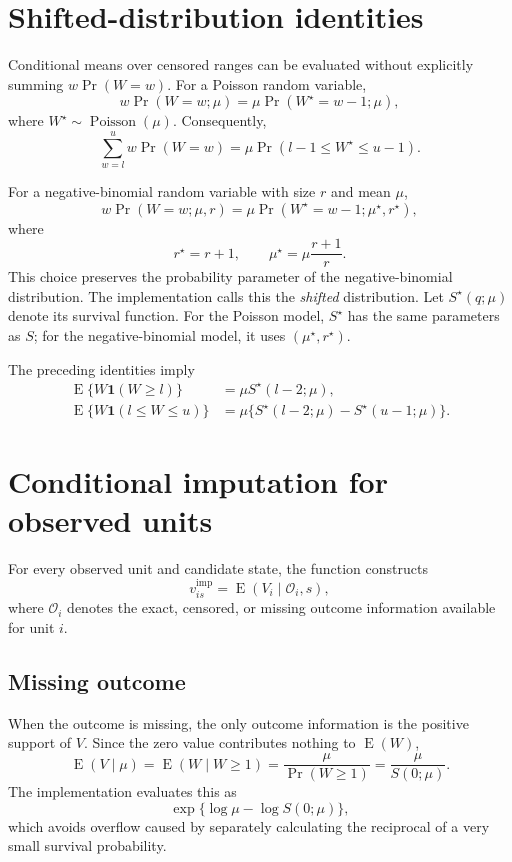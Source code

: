 \documentclass[11pt,a4paper]{article}
\begin{document}
\section{Shifted-distribution identities}

Conditional means over censored ranges can be evaluated without explicitly
summing $w\Pr(W=w)$. For a Poisson random variable,
\[
  w\Pr(W=w;\mu)
  =\mu\Pr(W^\star=w-1;\mu),
\]
where $W^\star\sim\operatorname{Poisson}(\mu)$. Consequently,
\[
  \sum_{w=l}^{u}w\Pr(W=w)
  =\mu\Pr(l-1\leq W^\star\leq u-1).
\]

For a negative-binomial random variable with size $r$ and mean $\mu$,
\[
  w\Pr(W=w;\mu,r)
  =\mu\Pr(W^\star=w-1;\mu^\star,r^\star),
\]
where
\[
  r^\star=r+1,
  \qquad
  \mu^\star=\mu\frac{r+1}{r}.
\]
This choice preserves the probability parameter of the negative-binomial
distribution. The implementation calls this the \emph{shifted} distribution.
Let $S^\star(q;\mu)$ denote its survival function. For the Poisson model,
$S^\star$ has the same parameters as $S$; for the negative-binomial model, it
uses $(\mu^\star,r^\star)$.

The preceding identities imply
\begin{align*}
  \operatorname{E}\{W\mathbf 1(W\geq l)\}
    &=\mu S^\star(l-2;\mu),\\
  \operatorname{E}\{W\mathbf 1(l\leq W\leq u)\}
    &=\mu\{S^\star(l-2;\mu)-S^\star(u-1;\mu)\}.
\end{align*}

\section{Conditional imputation for observed units}

For every observed unit and candidate state, the function constructs
\[
  v_{is}^{\mathrm{imp}}
  =\operatorname{E}(V_i\mid\mathcal O_i,s),
\]
where $\mathcal O_i$ denotes the exact, censored, or missing outcome
information available for unit $i$.

\subsection{Missing outcome}

When the outcome is missing, the only outcome information is the positive
support of $V$. Since the zero value contributes nothing to
$\operatorname{E}(W)$,
\[
  \operatorname{E}(V\mid\mu)
  =\operatorname{E}(W\mid W\geq1)
  =\frac{\mu}{\Pr(W\geq1)}
  =\frac{\mu}{S(0;\mu)}.
\]
The implementation evaluates this as
\[
  \exp\{\log\mu-\log S(0;\mu)\},
\]
which avoids overflow caused by separately calculating the reciprocal of a
very small survival probability.
\end{document}
